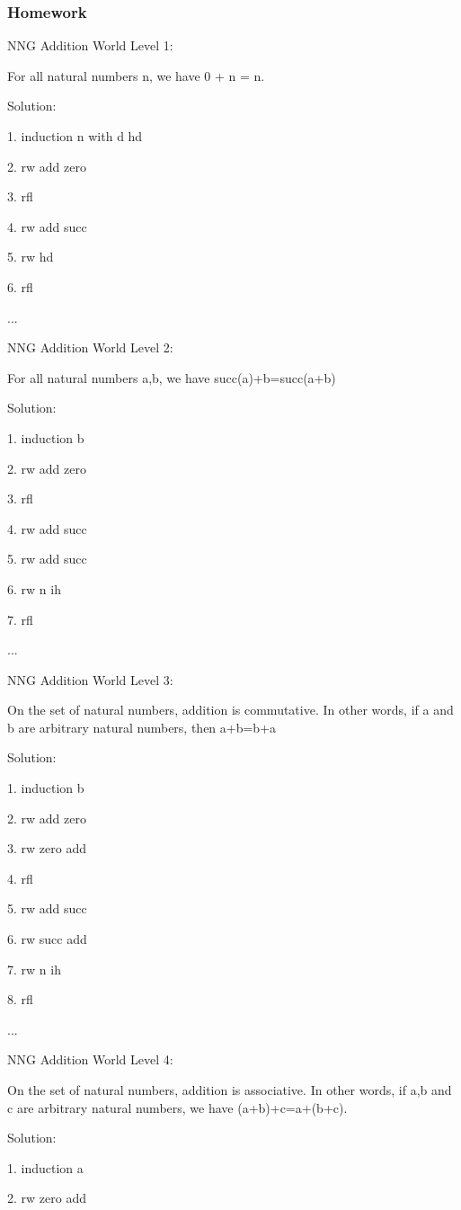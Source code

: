 \documentclass{article}
\theoremstyle{theorem}
\theoremstyle{definition}
\theoremstyle{remark}
\begin{document}
\subsubsection*{Homework}

NNG Addition World Level 1:

For all natural numbers n, we have 0 + n = n.

Solution: 

1. induction n with d hd

2. rw add zero

3. rfl

4. rw add succ

5. rw hd

6. rfl

...

NNG Addition World Level 2:

For all natural numbers a,b, we have succ(a)+b=succ(a+b)

Solution: 

1. induction b

2. rw add zero

3. rfl

4. rw add succ

5. rw add succ

6. rw n ih

7. rfl

...

NNG Addition World Level 3:

On the set of natural numbers, addition is commutative. In other words, if a and b are arbitrary natural numbers, then a+b=b+a

Solution: 

1. induction b

2. rw add zero

3. rw zero add

4. rfl

5. rw add succ

6. rw succ add

7. rw n ih

8. rfl

...

NNG Addition World Level 4:

On the set of natural numbers, addition is associative. In other words, if a,b and c are arbitrary natural numbers, we have (a+b)+c=a+(b+c).

Solution: 

1. induction a

2. rw zero add
\end{document}
